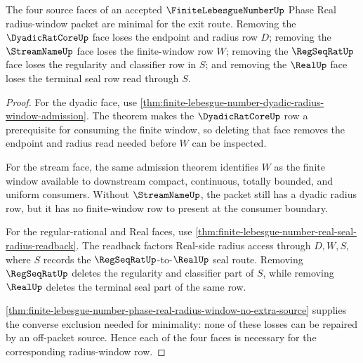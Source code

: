 \begin{theorem}
\label{thm:finite-lebesgue-number-phase-real-radius-window-face-minimality}
The four source faces of an accepted $\FiniteLebesgueNumberUp$ Phase Real radius-window packet are minimal for the exit route. Removing the $\DyadicRatCoreUp$ face loses the endpoint and radius row $D$; removing the $\StreamNameUp$ face loses the finite-window row $W$; removing the $\RegSeqRatUp$ face loses the regularity and classifier row in $S$; and removing the $\RealUp$ face loses the terminal seal row read through $S$.
\end{theorem}
\begin{proof}
For the dyadic face, use \autoref{thm:finite-lebesgue-number-dyadic-radius-window-admission}. The theorem makes the $\DyadicRatCoreUp$ row a prerequisite for consuming the finite window, so deleting that face removes the endpoint and radius read needed before $W$ can be inspected.

For the stream face, the same admission theorem identifies $W$ as the finite window available to downstream compact, continuous, totally bounded, and uniform consumers. Without $\StreamNameUp$, the packet still has a dyadic radius row, but it has no finite-window row to present at the consumer boundary.

For the regular-rational and Real faces, use \autoref{thm:finite-lebesgue-number-real-seal-radius-readback}. The readback factors Real-side radius access through $D,W,S$, where $S$ records the $\RegSeqRatUp$-to-$\RealUp$ seal route. Removing $\RegSeqRatUp$ deletes the regularity and classifier part of $S$, while removing $\RealUp$ deletes the terminal seal part of the same row.

\autoref{thm:finite-lebesgue-number-phase-real-radius-window-no-extra-source} supplies the converse exclusion needed for minimality: none of these losses can be repaired by an off-packet source. Hence each of the four faces is necessary for the corresponding radius-window row.
\end{proof}

